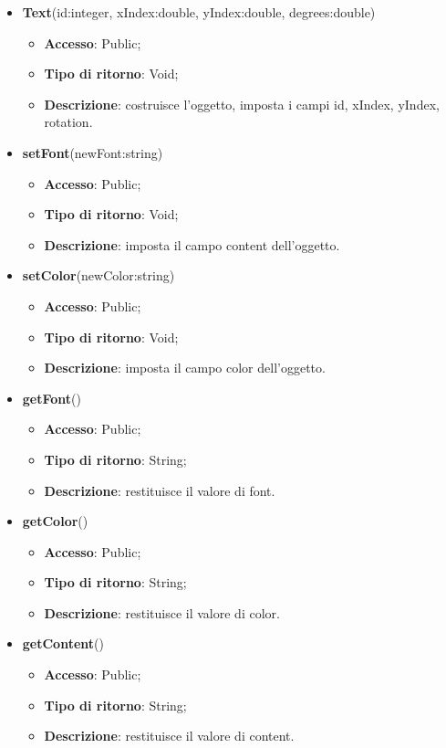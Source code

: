 {{			
			\begin{itemize}
				\item \textbf{Text}(id:integer, xIndex:double, yIndex:double, degrees:double)
				\begin{itemize}
					\item \textbf{Accesso}: Public;
					\item \textbf{Tipo di ritorno}: Void;
					\item \textbf{Descrizione}: costruisce l’oggetto, imposta i campi id, xIndex, yIndex, rotation.
				\end{itemize}
				\item \textbf{setFont}(newFont:string)
				\begin{itemize}
					\item \textbf{Accesso}: Public;
					\item \textbf{Tipo di ritorno}: Void;
					\item \textbf{Descrizione}: imposta il campo content dell’oggetto.
				\end{itemize}
				\item \textbf{setColor}(newColor:string)
				\begin{itemize}
					\item \textbf{Accesso}: Public;
					\item \textbf{Tipo di ritorno}: Void;
					\item \textbf{Descrizione}: imposta il campo color dell’oggetto.
				\end{itemize}
				\item \textbf{getFont}()
				\begin{itemize}
					\item \textbf{Accesso}: Public;
					\item \textbf{Tipo di ritorno}: String;
					\item \textbf{Descrizione}: restituisce il valore di font.
				\end{itemize}
				\item \textbf{getColor}()
				\begin{itemize}
					\item \textbf{Accesso}: Public;
					\item \textbf{Tipo di ritorno}: String;
					\item \textbf{Descrizione}: restituisce il valore di color.
				\end{itemize}
				\item \textbf{getContent}()
				\begin{itemize}
					\item \textbf{Accesso}: Public;
					\item \textbf{Tipo di ritorno}: String;
					\item \textbf{Descrizione}: restituisce il valore di content.
				\end{itemize}
			\end{itemize}
		}
}
